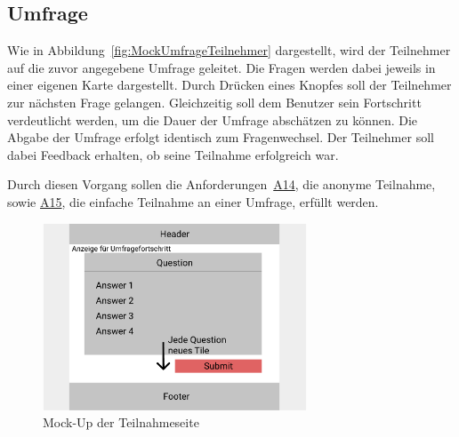 \subsection{Umfrage}
\label{ssec:konzept:client:umfrage}
Wie in Abbildung~\vref{fig:MockUmfrageTeilnehmer} dargestellt, wird der Teilnehmer auf die zuvor angegebene Umfrage geleitet.
Die Fragen werden dabei jeweils in einer eigenen Karte dargestellt.
Durch Drücken eines Knopfes soll der Teilnehmer zur nächsten Frage gelangen.
Gleichzeitig soll dem Benutzer sein Fortschritt verdeutlicht werden, um die Dauer der Umfrage abschätzen zu können.
Die Abgabe der Umfrage erfolgt identisch zum Fragenwechsel.
Der Teilnehmer soll dabei Feedback erhalten, ob seine Teilnahme erfolgreich war.

Durch diesen Vorgang sollen die Anforderungen~\hyperref[Anf:A14]{A14}, die anonyme Teilnahme, sowie \hyperref[Anf:15]{A15}, die einfache Teilnahme an einer Umfrage, erfüllt werden.

\begin{figure}[H]
	\centering
	\includegraphics[width=0.7\textwidth]{img/konzeption/client/umfrage_teilnehmer}
	\captionsetup{justification=centering, format=plain}
	\caption[Mock-Up der Teilnahmeseite]{Mock-Up der Teilnahmeseite\\\figma}
	\label{fig:MockUmfrageTeilnehmer}
\end{figure}
